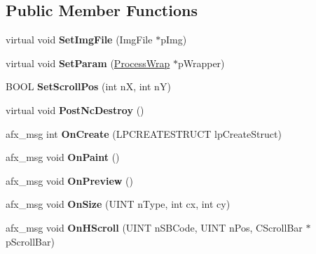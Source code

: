\subsection*{Public Member Functions}
\begin{DoxyCompactItemize}
\item 
\mbox{\label{class_process_view_a5b907e6d6920c9540fb6cefb287f5570}} 
virtual void {\bfseries Set\+Img\+File} (Img\+File $\ast$p\+Img)
\item 
\mbox{\label{class_process_view_a464aa6e662a5fe7670bf352f496ba60c}} 
virtual void {\bfseries Set\+Param} (\mbox{\hyperlink{class_process_wrap}{Process\+Wrap}} $\ast$p\+Wrapper)
\item 
\mbox{\label{class_process_view_ae0f8b6cc39a64ece62ef206014cbc18e}} 
B\+O\+OL {\bfseries Set\+Scroll\+Pos} (int nX, int nY)
\item 
\mbox{\label{class_process_view_a4877a8e9b9a0d1afd9553e3c71142196}} 
virtual void {\bfseries Post\+Nc\+Destroy} ()
\item 
\mbox{\label{class_process_view_a05940c5be5b5b213ff04c0088be1a865}} 
afx\+\_\+msg int {\bfseries On\+Create} (L\+P\+C\+R\+E\+A\+T\+E\+S\+T\+R\+U\+CT lp\+Create\+Struct)
\item 
\mbox{\label{class_process_view_ada60d6fb93c2746f70c4074feb9279b5}} 
afx\+\_\+msg void {\bfseries On\+Paint} ()
\item 
\mbox{\label{class_process_view_a09f448c77e2887a5747e3036bc739f7a}} 
afx\+\_\+msg void {\bfseries On\+Preview} ()
\item 
\mbox{\label{class_process_view_a0538625c6a1599287375668ef83dfd55}} 
afx\+\_\+msg void {\bfseries On\+Size} (U\+I\+NT n\+Type, int cx, int cy)
\item 
\mbox{\label{class_process_view_a60b5b22454247990d2002555230dceb7}} 
afx\+\_\+msg void {\bfseries On\+H\+Scroll} (U\+I\+NT n\+S\+B\+Code, U\+I\+NT n\+Pos, C\+Scroll\+Bar $\ast$p\+Scroll\+Bar)
\item 

\end{DoxyCompactItemize}
